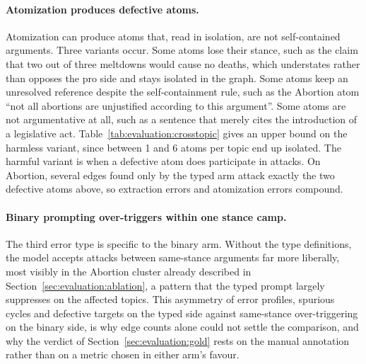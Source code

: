 \paragraph{Atomization produces defective atoms.}
Atomization can produce atoms that, read in isolation, are not self-contained
arguments. Three variants occur. Some atoms lose their stance, such as the
claim that two out of three meltdowns would cause no deaths, which understates
rather than opposes the pro side and stays isolated in the graph. Some atoms keep an
unresolved reference despite the self-containment rule, such as the Abortion
atom ``not all abortions are unjustified according to this argument''. Some
atoms are not argumentative at all, such as a sentence that merely cites the
introduction of a legislative act. Table~\ref{tab:evaluation:crosstopic} gives
an upper bound on the harmless variant, since between 1 and 6 atoms per topic
end up isolated. The harmful variant is when a defective atom does participate
in attacks. On Abortion, several edges found only by the typed arm attack
exactly the two defective atoms above, so extraction errors and atomization
errors compound.

\paragraph{Binary prompting over-triggers within one stance camp.}
The third error type is specific to the binary arm. Without the type
definitions, the model accepts attacks between same-stance arguments far more
liberally, most visibly in the Abortion cluster already described in
Section~\ref{sec:evaluation:ablation}, a pattern that the typed prompt largely
suppresses on the affected topics. This asymmetry of error profiles, spurious
cycles and defective targets on the typed side against same-stance
over-triggering on the binary side, is why edge counts alone could not settle
the comparison, and why the verdict of Section~\ref{sec:evaluation:gold} rests
on the manual annotation rather than on a metric chosen in either arm's favour.
